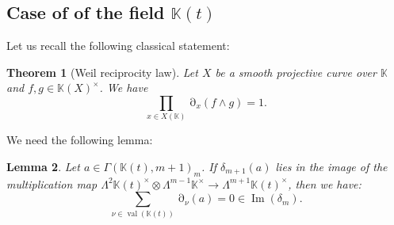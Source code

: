 \documentclass[12pt]{extarticle}
\newtheorem{theorem}{Theorem}[section]
\newtheorem{lemma}[theorem]{Lemma}
\def\mb{\mathbb}
\def\L{\Lambda}
\def\k{\mb K}
\def\t{\times}
\DeclareMathOperator{\ts}{\partial}
\DeclareMathOperator{\val}{val}
\DeclareMathOperator{\im}{Im}
\begin{document}
\subsection{Case of of the field $\k(t)$}
\label{subsec:SRL_1}
Let us recall the following classical statement:
\begin{theorem}[Weil reciprocity law]
\label{theorem:Weil_rec_law}
    Let $X$ be a smooth projective curve over $\k$ and $f,g\in\k(X)^\times$. We have
    $$\prod_{x\in X(\k)}\ts_x(f\wedge g)=1.$$
\end{theorem}
We need the following lemma:
\begin{lemma}
\label{lemma:Res_is_zero}
Let $a\in \Gamma(\k(t),m+1)_{m}$. If $\delta_{m+1}(a)$ lies in the image of the multiplication map $\L^2 \k(t)^\t\otimes \L^{m-1}\k^\t\to\L^{m+1}\k(t)^\t$, then we have:
$$\sum\limits_{\nu\in\val(\k(t))}\ts_\nu(a)=0\in \im(\delta_m).$$
\end{lemma}
\end{document}
